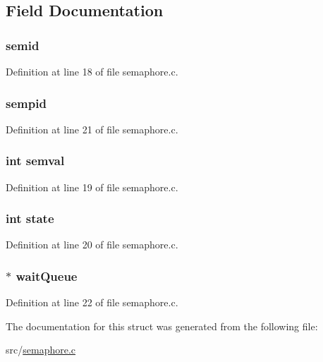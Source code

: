 \subsection{Field Documentation}
\hypertarget{structsemaphore_a9222a19bf63a4f9775ec6307f10955ac}{
\subsubsection[{semid}]{ {\bf semid}}}
\label{structsemaphore_a9222a19bf63a4f9775ec6307f10955ac}


Definition at line 18 of file semaphore.c.

\hypertarget{structsemaphore_ab2c2b336eae3da49c4f83d6f44c1fc7b}{
\subsubsection[{sempid}]{ {\bf sempid}}}
\label{structsemaphore_ab2c2b336eae3da49c4f83d6f44c1fc7b}


Definition at line 21 of file semaphore.c.

\hypertarget{structsemaphore_a6191200d6dbe7f09897db13350a06c61}{
\subsubsection[{semval}]{\setlength{\rightskip}{0pt plus 5cm}int {\bf semval}}}
\label{structsemaphore_a6191200d6dbe7f09897db13350a06c61}


Definition at line 19 of file semaphore.c.

\hypertarget{structsemaphore_a89f234133d3efe315836311cbf21c64b}{
\subsubsection[{state}]{\setlength{\rightskip}{0pt plus 5cm}int {\bf state}}}
\label{structsemaphore_a89f234133d3efe315836311cbf21c64b}


Definition at line 20 of file semaphore.c.

\hypertarget{structsemaphore_aa98d8a188e5b2388de0be4c7c48709fe}{
\subsubsection[{waitQueue}]{$\ast$ {\bf waitQueue}}}
\label{structsemaphore_aa98d8a188e5b2388de0be4c7c48709fe}


Definition at line 22 of file semaphore.c.



The documentation for this struct was generated from the following file:\begin{DoxyCompactItemize}
\item 
src/\hyperlink{semaphore_8c}{semaphore.c}\end{DoxyCompactItemize}
